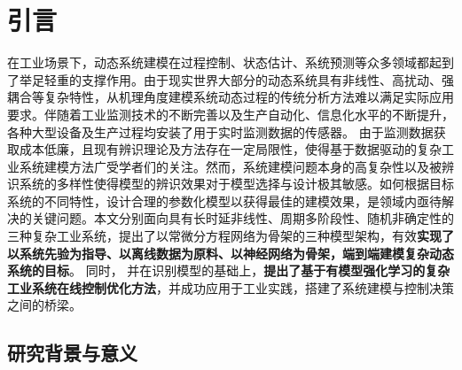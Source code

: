 
\chapter{引言}

\setcounter{page}{1}
在工业场景下，动态系统建模在过程控制、状态估计、系统预测等众多领域都起到了举足轻重的支撑作用。由于现实世界大部分的动态系统具有非线性、高扰动、强耦合等复杂特性，从机理角度建模系统动态过程的传统分析方法难以满足实际应用要求。伴随着工业监测技术的不断完善以及生产自动化、信息化水平的不断提升，各种大型设备及生产过程均安装了用于实时监测数据的传感器。 由于监测数据获取成本低廉，且现有辨识理论及方法存在一定局限性，使得基于数据驱动的复杂工业系统建模方法广受学者们的关注。然而，系统建模问题本身的高复杂性以及被辨识系统的多样性使得模型的辨识效果对于模型选择与设计极其敏感。如何根据目标系统的不同特性，设计合理的参数化模型以获得最佳的建模效果，是领域内亟待解决的关键问题。本文分别面向具有长时延非线性、周期多阶段性、随机非确定性的三种复杂工业系统，提出了以常微分方程网络为骨架的三种模型架构，有效\textbf{实现了以系统先验为指导、以离线数据为原料、以神经网络为骨架，端到端建模复杂动态系统的目标}。
同时，
并在识别模型的基础上，\textbf{提出了基于有模型强化学习的复杂工业系统在线控制优化方法}，并成功应用于工业实践，搭建了系统建模与控制决策之间的桥梁。
\section{研究背景与意义}
    





